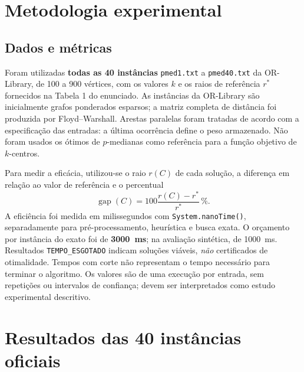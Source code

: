 \documentclass[12pt,a4paper]{article}
\begin{document}
\section{Metodologia experimental}
\subsection{Dados e métricas}
Foram utilizadas \textbf{todas as 40 instâncias} \texttt{pmed1.txt} a
\texttt{pmed40.txt} da OR-Library, de 100 a 900 vértices, com os valores
$k$ e os raios de referência $r^*$ fornecidos na Tabela 1 do enunciado.
As instâncias da OR-Library são inicialmente grafos ponderados esparsos;
a matriz completa de distância foi produzida por Floyd--Warshall.
Arestas paralelas foram tratadas de acordo com a especificação das entradas:
a última ocorrência define o peso armazenado. Não foram usados os ótimos
de $p$-medianas como referência para a função objetivo de $k$-centros.

Para medir a eficácia, utilizou-se o raio $r(C)$ de cada solução, a diferença
em relação ao valor de referência e o percentual
\[
\operatorname{gap}(C)=100\frac{r(C)-r^*}{r^*}\,\%.
\]
A eficiência foi medida em milissegundos com \texttt{System.nanoTime()},
separadamente para pré-processamento, heurística e busca exata.
O orçamento por instância do exato foi de \textbf{3000~ms}; na avaliação
sintética, de 1000~ms. Resultados \texttt{TEMPO\_ESGOTADO} indicam
soluções viáveis, \emph{não} certificados de otimalidade. Tempos
com corte não representam o tempo necessário para terminar o algoritmo.
Os valores são de uma execução por entrada, sem repetições ou intervalos
de confiança; devem ser interpretados como estudo experimental descritivo.

\section{Resultados das 40 instâncias oficiais}
\end{document}
